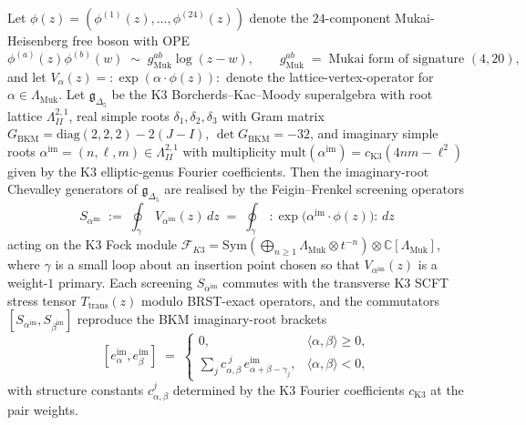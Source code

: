 \begin{theorem}
\label{thm:k3ca-imaginary-root-screenings}
Let $\phi(z) = (\phi^{(1)}(z),\ldots,\phi^{(24)}(z))$ denote the
$24$-component Mukai-Heisenberg free boson with OPE
\[
 \phi^{(a)}(z)\phi^{(b)}(w) \;\sim\; g^{ab}_{\mathrm{Muk}}\log(z-w),
 \qquad
 g^{ab}_{\mathrm{Muk}}
 \;=\;
 \text{Mukai form of signature }(4,20),
\]
and let $V_\alpha(z) = {:}\exp(\alpha\cdot\phi(z)){:}$ denote the
lattice-vertex-operator for $\alpha\in\Lambda_{\mathrm{Muk}}$. Let
$\mathfrak g_{\Delta_5}$ be the K3 Borcherds--Kac--Moody superalgebra
with root lattice $\Lambda^{2,1}_{II}$, real simple roots
$\delta_1,\delta_2,\delta_3$ with Gram matrix
$G_{\mathrm{BKM}} = \mathrm{diag}(2,2,2) - 2(J-I)$,
$\det G_{\mathrm{BKM}} = -32$, and imaginary simple roots
$\alpha^{\mathrm{im}} = (n,\ell,m)\in\Lambda^{2,1}_{II}$ with
multiplicity
$\mathrm{mult}(\alpha^{\mathrm{im}}) = c_{\mathrm{K3}}(4nm-\ell^2)$
given by the K3 elliptic-genus Fourier coefficients.
Then the imaginary-root Chevalley generators of $\mathfrak g_{\Delta_5}$
are realised by the Feigin--Frenkel screening operators
\begin{equation}
\label{eq:k3ca-screening}
 S_{\alpha^{\mathrm{im}}}
 \;:=\;
 \oint_{\gamma}\;V_{\alpha^{\mathrm{im}}}(z)\,dz
 \;=\;
 \oint_{\gamma}\;{:}\exp\!\bigl(\alpha^{\mathrm{im}}\!\cdot\phi(z)\bigr){:}\,dz
\end{equation}
acting on the K3 Fock module
$\mathcal F_{K3} = \mathrm{Sym}(\bigoplus_{n\geq 1}\Lambda_{\mathrm{Muk}}\otimes t^{-n})\otimes\mathbb C[\Lambda_{\mathrm{Muk}}]$,
where $\gamma$ is a small loop about an insertion point chosen so that
$V_{\alpha^{\mathrm{im}}}(z)$ is a weight-$1$ primary. Each screening
$S_{\alpha^{\mathrm{im}}}$ commutes with the transverse K3 SCFT
stress tensor $T_{\mathrm{trans}}(z)$ modulo BRST-exact operators,
and the commutators
$[S_{\alpha^{\mathrm{im}}}, S_{\beta^{\mathrm{im}}}]$ reproduce the
BKM imaginary-root brackets
\begin{equation}
\label{eq:k3ca-bkm-imag-bracket}
 [e^{\mathrm{im}}_\alpha, e^{\mathrm{im}}_\beta]
 \;=\;
 \begin{cases}
 0, & \langle\alpha,\beta\rangle \geq 0, \\
 \sum_{j} c_{\alpha,\beta}^{\;j}\, e^{\mathrm{im}}_{\alpha+\beta-\gamma_j}, & \langle\alpha,\beta\rangle < 0,
 \end{cases}
\end{equation}
with structure constants $c_{\alpha,\beta}^j$ determined by the
K3 Fourier coefficients $c_{\mathrm{K3}}$ at the pair weights.
\end{theorem}

